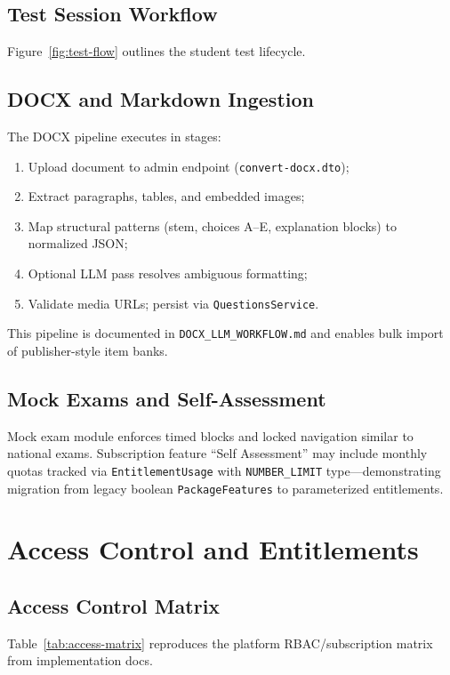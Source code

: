 \subsection{Test Session Workflow}
Figure~\ref{fig:test-flow} outlines the student test lifecycle.


\subsection{DOCX and Markdown Ingestion}
The DOCX pipeline executes in stages:
\begin{enumerate}
  \item Upload document to admin endpoint (\texttt{convert-docx.dto});
  \item Extract paragraphs, tables, and embedded images;
  \item Map structural patterns (stem, choices A--E, explanation blocks) to normalized JSON;
  \item Optional LLM pass resolves ambiguous formatting;
  \item Validate media URLs; persist via \texttt{QuestionsService}.
\end{enumerate}
This pipeline is documented in \texttt{DOCX\_LLM\_WORKFLOW.md} and enables bulk import of publisher-style item banks.

\subsection{Mock Exams and Self-Assessment}
Mock exam module enforces timed blocks and locked navigation similar to national exams. Subscription feature ``Self Assessment'' may include monthly quotas tracked via \texttt{EntitlementUsage} with \texttt{NUMBER\_LIMIT} type---demonstrating migration from legacy boolean \texttt{PackageFeatures} to parameterized entitlements.

\section{Access Control and Entitlements}
\subsection{Access Control Matrix}
Table~\ref{tab:access-matrix} reproduces the platform RBAC/subscription matrix from implementation docs.

